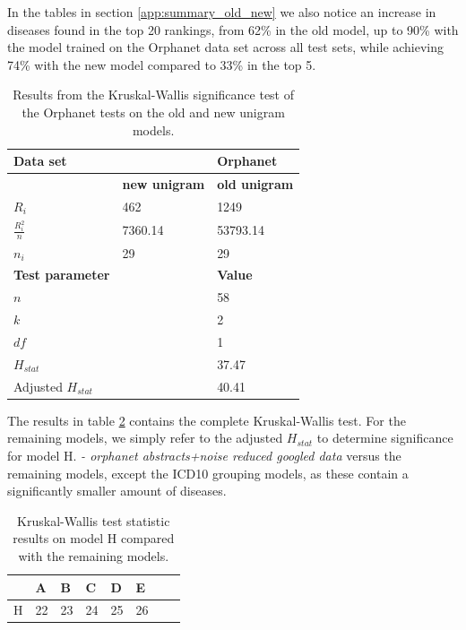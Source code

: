 \documentclass[10pt,letterpaper,final]{article}
\begin{document}
In the tables in section \ref{app:summary_old_new} we also notice an
increase in diseases found in the top 20 rankings, from 62\% in the old
model, up to 90\% with the model trained on the Orphanet data set across
all test sets, while achieving 74\% with the new model compared to 33\%
in the top 5.

\begin{table}[here]
\begin{center}
\begin{tabular}{lll}
    \textbf{Data set} & & \textbf{Orphanet} \\ \hline\hline
 &	\textbf{new unigram} &	\textbf{old unigram} \\ \hline
$R_{i}$ &	462 &	1249 \\
$\frac{R_{i}^2}{n}$ &	7360.14	& 53793.14 \\
$n_{i}$	& 29	& 29 \\ \hline \hline
\textbf{Test parameter}	&	&\textbf{Value} \\ \hline
$n$	 &  &  58 \\
$k$  &  &  2 \\
$df$ &  &  1 \\ \hline \hline
$H_{stat}$  &  &  37.47 \\
Adjusted $H_{stat}$ & &  40.41 \\
\end{tabular}
    \caption{Results from the Kruskal-Wallis significance test of the Orphanet tests on the old and new unigram models.}
    \label{tab:orpha_old_new_stat}
\end{center}
\end{table}

The results in table \ref{tab:H_vs_rest} contains the complete
Kruskal-Wallis test. For the remaining models, we simply refer to the
adjusted $H_{stat}$ to determine significance for model H. \textit{- orphanet
abstracts+noise reduced googled data} versus the remaining models,
except the ICD10 grouping models, as these contain a significantly
smaller amount of diseases.

\begin{table}
\begin{center}
	\begin{tabular}{llllllll}
		  & A  &  B &  C &  D &  E \\ \hline
		H & 22 & 23 & 24 & 25 & 26 \\
	\end{tabular}
	\caption{Kruskal-Wallis test statistic results on model H compared
	with the remaining models.}
	\label{tab:H_vs_rest}
\end{center}
\end{table}
\end{document}
